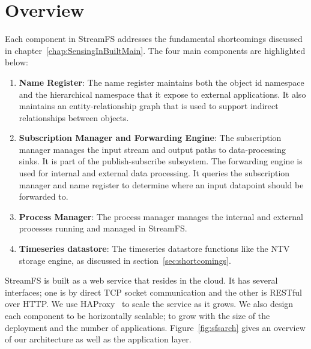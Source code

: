 \section{Overview}
Each component in StreamFS addresses the fundamental shortcomings discussed in chapter~\ref{chap:SensingInBuiltMain}.
The four main components are highlighted below:

\begin{enumerate}

\item \textbf{Name Register}: The name register maintains both the object id namespace and the hierarchical namespace
that it expose to external applications.  It also maintains an entity-relationship graph that is used to support
indirect relationships between objects.

\item \textbf{Subscription Manager and Forwarding Engine}: The subscription manager manages the input stream and output
paths to data-processing sinks.  It is part of the publish-subscribe subsystem.  The forwarding engine is used for internal 
and external data processing.  It queries the
subscription manager and name register to determine where an input datapoint should be forwarded to.

\item \textbf{Process Manager}: The process manager manages the internal and external processes running and managed in StreamFS.

\item \textbf{Timeseries datastore}: The timeseries datastore functions like the NTV storage engine, as discussed in 
section~\ref{sec:shortcomings}.

\end{enumerate}

StreamFS is built as a web service that resides in the cloud.  It has several interfaces; one is by direct TCP socket communication and 
the other is RESTful~\cite{rest} over HTTP.  We use HAProxy~\cite{haproxy} to scale the service as it grows.  We also design each component
to be horizontally scalable; to grow with the size of the deployment and the number of applications.
Figure~\ref{fig:sfsarch} gives an overview of our architecture as well as the application layer.














